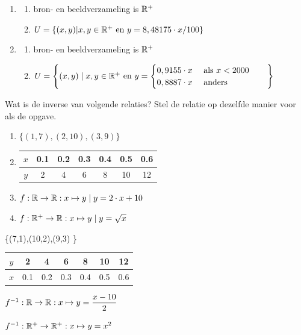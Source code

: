 \begin{oef}
\begin{opl}
\begin{enumerate}
\item 
\begin{enumerate}
\item bron- en beeldverzameling is  $\mathbb{R}^+$
\item $U=\{(x,y)|x,y\in \mathbb{R}^+\text{ en } y=8,48175\cdot x/100\}$
\end{enumerate}
\item 
\begin{enumerate}
\item bron- en beeldverzameling is  $\mathbb{R}^+$
\item $U=\left\lbrace(x,y)\;|\;x,y\in \mathbb{R}^+\text{ en } y=
\begin{cases}
0,9155\cdot x&\text{ als }x<2000\\
0,8887\cdot x&\text{ anders }
\end{cases} \qquad
\right\rbrace$
\end{enumerate}

\end{enumerate}
\end{opl}
\end{oef}

\begin{oef}
Wat is de inverse van volgende relaties? Stel de relatie op dezelfde manier voor als de opgave.
\begin{enumerate}
\item $\{(1,7),(2,10),(3,9) \}$
\item 
\begin{tabular}{c|cccccc}
$x$ & \num{0.1} & \num{0.2} & \num{0.3} & \num{0.4} & \num{0.5} & \num{0.6} \\ 
\midrule
$y$ & 2 & 4 & 6 & 8 & 10 & 12 \\ 
\end{tabular} 
\item $f: \mathbb{R}\rightarrow\mathbb{R}:x\mapsto y \mid y=2\cdot x+10 $
\item $f: \mathbb{R}^+\rightarrow\mathbb{R}:x\mapsto y \mid y=\sqrt{x}$
\end{enumerate}
\begin{opl}
\item \{(7,1),(10,2),(9,3) \}
\item 
\begin{tabular}{c|cccccc}
$y$ & 2 & 4 & 6 & 8 & 10 & 12 \\ 
\midrule
$x$ & \num{0.1} & \num{0.2} & \num{0.3} & \num{0.4} & \num{0.5} & \num{0.6} \\ 
\end{tabular} 
\item $f^{-1}: \mathbb{R}\rightarrow\mathbb{R}:x\mapsto  y=\dfrac{x-10}{2} $
\item $f^{-1}: \mathbb{R}^+\rightarrow\mathbb{R}^+:x\mapsto y=x^2$
\end{opl}
\end{oef}

